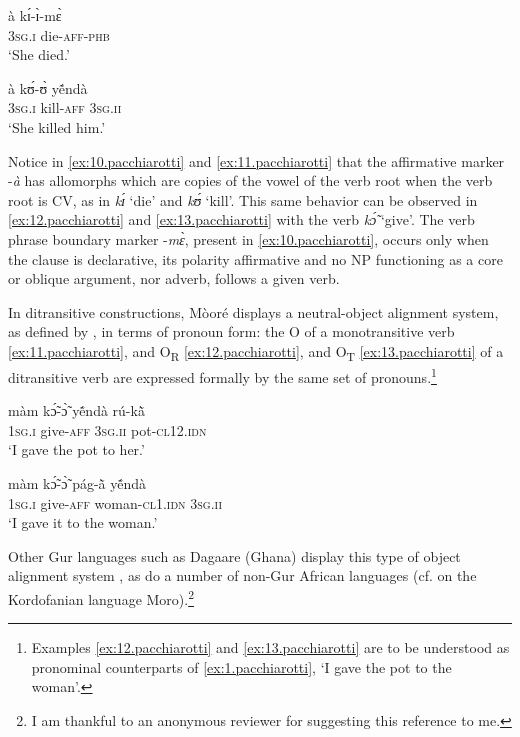 \documentclass[output=paper]{langsci/langscibook}
\begin{document}
\ea
\label{ex:10.pacchiarotti}
\gll \`{a}    kɪ́-ɪ̀-mɛ̀      \\     
\textsc{3sg.i} die-\textsc{aff-phb} \\
\glt`She died.'
\z 

\ea
\label{ex:11.pacchiarotti}
\gll \`{a}    kʊ́-ʊ̀    yẽ́nd\`{a}\\
\textsc{3sg.i}    kill-\textsc{aff}  \textsc{3sg.ii}\\
\glt`She killed him.'
\z

Notice in \ref{ex:10.pacchiarotti} and \ref{ex:11.pacchiarotti} that the affirmative marker -\textit{\`{a}} has allomorphs which are copies of the vowel of the verb root when the verb root is CV, as in \textit{kɪ́} `die' and \textit{kʊ́} `kill'. This same behavior can be observed in \ref{ex:12.pacchiarotti} and \ref{ex:13.pacchiarotti} with the verb \textit{k\'{\~{ɔ}}} `give'. The verb phrase boundary marker -\textit{mɛ̀}, present in \ref{ex:10.pacchiarotti}, occurs only when the clause is declarative, its polarity affirmative and no NP functioning as a core or oblique argument, nor adverb, follows a given verb.  

In ditransitive constructions, M\`{o}or\'{e} displays a neutral-object alignment system, as defined by \citet{malchukovetal2010}, in terms of pronoun form: the O of a monotransitive verb \ref{ex:11.pacchiarotti}, and O\textsubscript{R} \ref{ex:12.pacchiarotti}, and O\textsubscript{T} \ref{ex:13.pacchiarotti} of a ditransitive verb are expressed formally by the same set of pronouns.\footnote{Examples \ref{ex:12.pacchiarotti} and \ref{ex:13.pacchiarotti} are to be understood as pronominal counterparts of \ref{ex:1.pacchiarotti}, `I gave the pot to the woman'.} 

\ea
\label{ex:12.pacchiarotti}
\gll m\`{a}m    kɔ̃́-ɔ̃̀      y\'{\~{e}}nd\`{a}    r\'{u}-k\`{\~{a}}\\
\textsc{1sg.i  }  give-\textsc{aff}    \textsc{3sg.ii  }  pot\textsc{-cl12.idn} \\
\glt `I gave the pot to her.'
\z

\ea
\label{ex:13.pacchiarotti}
\gll m\`{a}m    kɔ̃́-ɔ̃̀    p\'{a}g-\`{\~{a}}      y\'{\~{e}}nd\`{a}\\
\textsc{1sg.i  }  give-\textsc{aff}  woman-\textsc{cl1.idn}  \textsc{3sg.ii} \\
\glt `I gave it to the woman.'
\z

Other Gur languages such as Dagaare (Ghana) display this type of object alignment system \citep{bodomo1997}, as do a number of non-Gur African languages (cf. \citealt{ackermanetaltoappear} on the Kordofanian language Moro).\footnote{I am thankful to an anonymous reviewer for suggesting this reference to me.}
\end{document}
